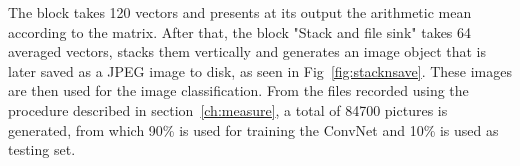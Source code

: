 The block takes 120 vectors and presents at its output the arithmetic mean according to the matrix. After that, the block "Stack and file sink" takes 64 averaged vectors, stacks them vertically and generates an image object that is later saved as a JPEG image to disk, as seen in Fig~\ref{fig:stacknsave}. These images are then used for the image classification. From the files recorded using the procedure described in section~\ref{ch:measure}, a total of 84700 pictures is generated, from which 90\% is used for training the \ac{ConvNet} and 10\% is used as testing set.

